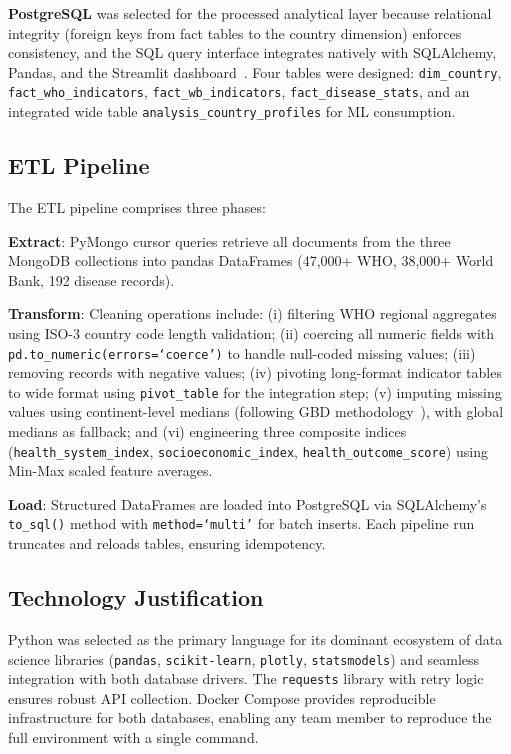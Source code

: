 \documentclass[conference]{IEEEtran}
\begin{document}
\textbf{PostgreSQL} was selected for the processed analytical layer because
relational integrity (foreign keys from fact tables to the country dimension)
enforces consistency, and the SQL query interface integrates natively with
SQLAlchemy, Pandas, and the Streamlit dashboard~\cite{postgresql2024}. Four
tables were designed: \texttt{dim\_country}, \texttt{fact\_who\_indicators},
\texttt{fact\_wb\_indicators}, \texttt{fact\_disease\_stats}, and an integrated
wide table \texttt{analysis\_country\_profiles} for ML consumption.

\subsection{ETL Pipeline}

The ETL pipeline comprises three phases:

\textbf{Extract}: PyMongo cursor queries retrieve all documents from the three
MongoDB collections into pandas DataFrames (47,000+ WHO, 38,000+ World Bank,
192 disease records).

\textbf{Transform}: Cleaning operations include: (i) filtering WHO regional
aggregates using ISO-3 country code length validation; (ii) coercing all
numeric fields with \texttt{pd.to\_numeric(errors=`coerce')} to handle
null-coded missing values; (iii) removing records with negative values;
(iv) pivoting long-format indicator tables to wide format using
\texttt{pivot\_table} for the integration step; (v) imputing missing values
using continent-level medians (following GBD methodology~\cite{dicker2018}),
with global medians as fallback; and (vi) engineering three composite indices
(\texttt{health\_system\_index}, \texttt{socioeconomic\_index},
\texttt{health\_outcome\_score}) using Min-Max scaled feature averages.

\textbf{Load}: Structured DataFrames are loaded into PostgreSQL via
SQLAlchemy's \texttt{to\_sql()} method with \texttt{method=`multi'} for
batch inserts. Each pipeline run truncates and reloads tables, ensuring
idempotency.

\subsection{Technology Justification}
Python was selected as the primary language for its dominant ecosystem of
data science libraries (\texttt{pandas}, \texttt{scikit-learn},
\texttt{plotly}, \texttt{statsmodels}) and seamless integration with both
database drivers. The \texttt{requests} library with retry logic ensures
robust API collection. Docker Compose provides reproducible infrastructure
for both databases, enabling any team member to reproduce the full environment
with a single command.
\end{document}
